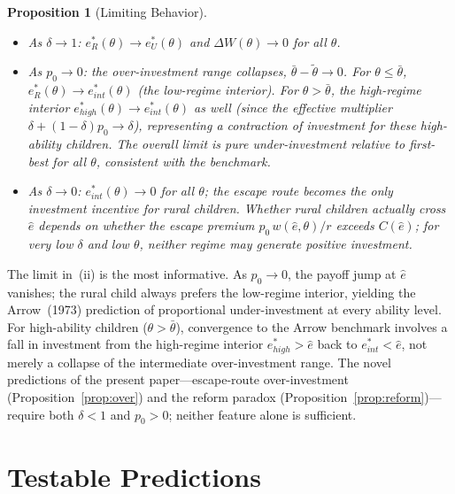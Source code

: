 \documentclass[12pt]{article}
\theoremstyle{plain}
\newtheorem{proposition}{Proposition}
\theoremstyle{definition}
\theoremstyle{remark}
\begin{document}
\begin{proposition}[Limiting Behavior]
\label{prop:boundary}
\begin{itemize}
  \item[\textit{(i)}] As $\delta\to 1$: $e^{*}_{R}(\theta)\to e^{*}_{U}(\theta)$
    and $\Delta W(\theta)\to 0$ for all $\theta$.
  \item[\textit{(ii)}] As $p_{0}\to 0$: the over-investment range collapses,
    $\bar{\theta}-\tilde{\theta}\to 0$.  For $\theta\leq\bar{\theta}$,
    $e^{*}_{R}(\theta)\to e^{*}_{int}(\theta)$ (the low-regime interior).
    For $\theta>\bar{\theta}$, the high-regime interior $e^{*}_{high}(\theta)\to
    e^{*}_{int}(\theta)$ as well (since the effective multiplier
    $\delta+(1-\delta)p_{0}\to\delta$), representing a \emph{contraction} of
    investment for these high-ability children.  The overall limit is pure
    under-investment relative to first-best for all $\theta$, consistent with
    the \citet{Arrow1973} benchmark.
  \item[\textit{(iii)}] As $\delta\to 0$: $e^{*}_{int}(\theta)\to 0$ for all
    $\theta$; the escape route becomes the only investment incentive for rural
    children.  Whether rural children actually cross $\hat{e}$ depends on whether
    the escape premium $p_{0}\,w(\hat{e},\theta)/r$ exceeds $C(\hat{e})$; for
    very low $\delta$ and low $\theta$, neither regime may generate positive
    investment.
\end{itemize}
\end{proposition}

The limit in~(ii) is the most informative.  As $p_{0}\to 0$, the payoff jump at
$\hat{e}$ vanishes; the rural child always prefers the low-regime interior,
yielding the Arrow~(1973) prediction of proportional under-investment at every
ability level.  For high-ability children ($\theta>\bar{\theta}$), convergence
to the Arrow benchmark involves a fall in investment from the high-regime interior
$e^{*}_{high}>\hat{e}$ back to $e^{*}_{int}<\hat{e}$, not merely a collapse of
the intermediate over-investment range.  The novel predictions of the present
paper---escape-route over-investment (Proposition~\ref{prop:over}) and the reform
paradox (Proposition~\ref{prop:reform})---require both $\delta<1$ and $p_{0}>0$;
neither feature alone is sufficient.

\section{Testable Predictions}
\end{document}

